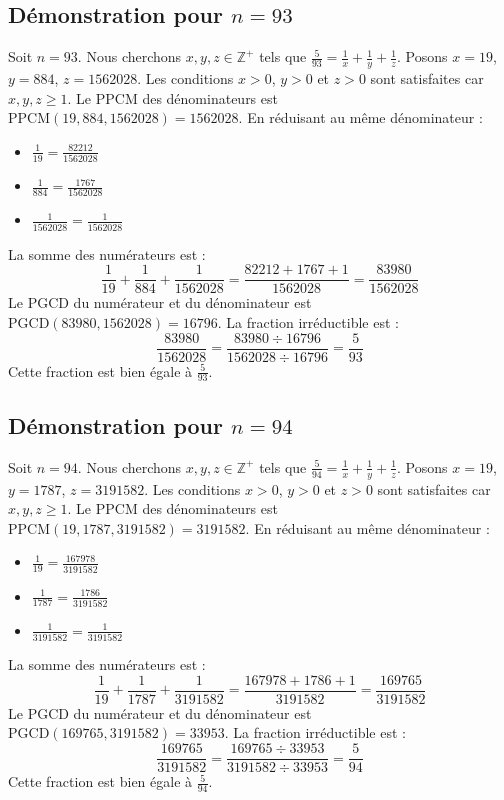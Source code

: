 \documentclass[11pt,a4paper]{article}
\begin{document}
\subsection{Démonstration pour $n = 93$}
Soit $n = 93$. Nous cherchons $x, y, z \in \mathbb{Z}^{+}$ tels que $\frac{5}{93} = \frac{1}{x} + \frac{1}{y} + \frac{1}{z}$.
Posons $x = 19$, $y = 884$, $z = 1562028$.
Les conditions $x > 0$, $y > 0$ et $z > 0$ sont satisfaites car $x, y, z \geq 1$.
Le PPCM des dénominateurs est $\text{PPCM}(19, 884, 1562028) = 1562028$.
En réduisant au même dénominateur :
\begin{itemize}
    \item $\frac{1}{19} = \frac{82212}{1562028}$
    \item $\frac{1}{884} = \frac{1767}{1562028}$
    \item $\frac{1}{1562028} = \frac{1}{1562028}$
\end{itemize}
La somme des numérateurs est :
$$ \frac{1}{19} + \frac{1}{884} + \frac{1}{1562028} = \frac{82212 + 1767 + 1}{1562028} = \frac{83980}{1562028} $$
Le PGCD du numérateur et du dénominateur est $\text{PGCD}(83980, 1562028) = 16796$.
La fraction irréductible est :
$$ \frac{83980}{1562028} = \frac{83980 \div 16796}{1562028 \div 16796} = \frac{5}{93} $$
Cette fraction est bien égale à $\frac{5}{93}$.

\subsection{Démonstration pour $n = 94$}
Soit $n = 94$. Nous cherchons $x, y, z \in \mathbb{Z}^{+}$ tels que $\frac{5}{94} = \frac{1}{x} + \frac{1}{y} + \frac{1}{z}$.
Posons $x = 19$, $y = 1787$, $z = 3191582$.
Les conditions $x > 0$, $y > 0$ et $z > 0$ sont satisfaites car $x, y, z \geq 1$.
Le PPCM des dénominateurs est $\text{PPCM}(19, 1787, 3191582) = 3191582$.
En réduisant au même dénominateur :
\begin{itemize}
    \item $\frac{1}{19} = \frac{167978}{3191582}$
    \item $\frac{1}{1787} = \frac{1786}{3191582}$
    \item $\frac{1}{3191582} = \frac{1}{3191582}$
\end{itemize}
La somme des numérateurs est :
$$ \frac{1}{19} + \frac{1}{1787} + \frac{1}{3191582} = \frac{167978 + 1786 + 1}{3191582} = \frac{169765}{3191582} $$
Le PGCD du numérateur et du dénominateur est $\text{PGCD}(169765, 3191582) = 33953$.
La fraction irréductible est :
$$ \frac{169765}{3191582} = \frac{169765 \div 33953}{3191582 \div 33953} = \frac{5}{94} $$
Cette fraction est bien égale à $\frac{5}{94}$.
\end{document}
